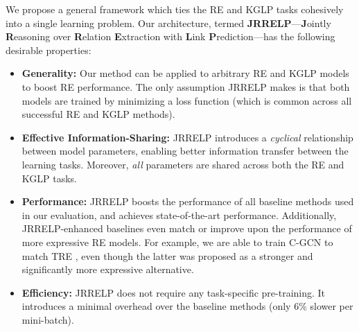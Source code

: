 We propose a general framework which ties the RE and KGLP tasks cohesively into a single learning problem.
Our architecture, termed \textbf{JRRELP}---\textbf{J}ointly \textbf{R}easoning over \textbf{R}elation \textbf{E}xtraction with \textbf{L}ink \textbf{P}rediction---has the following desirable properties:
\begin{itemize}[noitemsep,topsep=0pt,label=--,leftmargin=2em]
  \item \textbf{Generality:}
    Our method can be applied to arbitrary RE and KGLP models to boost RE performance.
    The only assumption JRRELP makes is that both models are trained by minimizing a loss function (which is common across all successful RE and KGLP methods).
  \item \textbf{Effective Information-Sharing:}
    JRRELP introduces a {\em cyclical} relationship between model parameters, enabling better information transfer between the learning tasks.
    Moreover, {\em all} parameters are shared across both the RE and KGLP tasks.
  \item \textbf{Performance:}
    JRRELP boosts the performance of all baseline methods used in our evaluation, and achieves state-of-the-art performance.
    Additionally, JRRELP-enhanced baselines even match or improve upon the performance of more expressive RE models.
    For example, we are able to train C-GCN \citep{cgcn} to match TRE \citep{tre}, even though the latter was proposed as a stronger and significantly more expressive alternative.
  \item \textbf{Efficiency:}
    JRRELP does not require any task-specific pre-training.
    It introduces a minimal overhead over the baseline methods (only $6\%$ slower per mini-batch).
\end{itemize}

